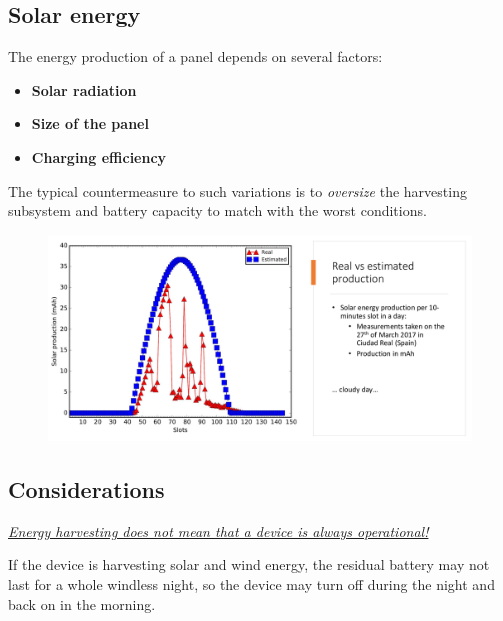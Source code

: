 \subsection{Solar energy}
\begin{paracol}{2}
   \colfill
   The energy production of a panel depends on several factors:
   \begin{itemize}
      \item \textbf{Solar radiation}
      {\ns{}}
      \item \textbf{Size of the panel}
      \item \textbf{Charging efficiency}
   \end{itemize}
   The typical countermeasure to such variations is to \textit{oversize} the harvesting subsystem and battery capacity to match with the worst conditions. 
   \colfill
   \switchcolumn
   \begin{figure}[htbp]
      \centering
      \includegraphics{images/solarharvesting.png}
      \label{fig:solarharvesting.png}
   \end{figure}
\end{paracol}


\subsection{Considerations}
\begin{center}
   \textit{\ul{Energy harvesting does not mean that a device is always operational!}}
\end{center}

If the device is harvesting solar and wind energy, the residual battery may not last for a whole windless night, so the device may turn off during the night and back on in the morning. 

